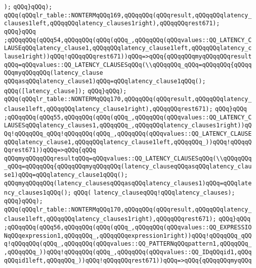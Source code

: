 \verb|);|\newline
\verb|qQQq}qQQq);|\newline
\verb|qQQq(qQQqlr_table::NONTERMqQQq169,qQQqqQQq(qQQqresult,qQQqqQQqlatency_clauses1left,qQQqqQQqlatency_clauses1right),qQQqqQQqrest671);|\newline
\verb|qQQq}qQQq|\newline
\verb|;qQQqqQQq(qQQq54,qQQqqQQq(qQQq(qQQq_,qQQqqQQq(qQQqvalues::QQ_LATENCY_CLAUSEqQQqlatency_clause1,qQQqqQQqlatency_clause1left,qQQqqQQqlatency_clause1right))qQQq!qQQqqQQqrest671))qQQq=>qQQq{qQQqqQQqmyqQQqqQQqresultqQQq=qQQqvalues::QQ_LATENCY_CLAUSESqQQq(\\qQQqqQQq_qQQq=qQQqqQQq{qQQqqQQqmyqQQqqQQq(latency_clause|\newline
\verb|qQQqasqQQqlatency_clause1)qQQq=qQQqlatency_clause1qQQq();|\newline
\verb|qQQq([latency_clause]);|\newline
\verb|qQQq}qQQq);|\newline
\verb|qQQq(qQQqlr_table::NONTERMqQQq170,qQQqqQQq(qQQqresult,qQQqqQQqlatency_clause1left,qQQqqQQqlatency_clause1right),qQQqqQQqrest671);|\newline
\verb|qQQq}qQQq|\newline
\verb|;qQQqqQQq(qQQq55,qQQqqQQq(qQQq(qQQq_,qQQqqQQq(qQQqvalues::QQ_LATENCY_CLAUSESqQQqlatency_clauses1,qQQqqQQq_,qQQqqQQqlatency_clauses1right))qQQq!qQQqqQQq_qQQq!qQQqqQQq(qQQq_,qQQqqQQq(qQQqvalues::QQ_LATENCY_CLAUSEqQQqlatency_clause1,qQQqqQQqlatency_clause1left,qQQqqQQq_))qQQq!qQQqqQQqrest671))qQQq=>qQQq{qQQq|\newline
\verb|qQQqmyqQQqqQQqresultqQQq=qQQqvalues::QQ_LATENCY_CLAUSESqQQq(\\qQQqqQQq_qQQq=qQQqqQQq{qQQqqQQqmyqQQqqQQq(latency_clauseqQQqasqQQqlatency_clause1)qQQq=qQQqlatency_clause1qQQq();|\newline
\verb|qQQqmyqQQqqQQq(latency_clausesqQQqasqQQqlatency_clauses1)qQQq=qQQqlatency_clauses1qQQq();|\newline
\verb|qQQq(|\newline
\verb|latency_clauseqQQq!qQQqlatency_clauses);|\newline
\verb|qQQq}qQQq);|\newline
\verb|qQQq(qQQqlr_table::NONTERMqQQq170,qQQqqQQq(qQQqresult,qQQqqQQqlatency_clause1left,qQQqqQQqlatency_clauses1right),qQQqqQQqrest671);|\newline
\verb|qQQq}qQQq|\newline
\verb|;qQQqqQQq(qQQq56,qQQqqQQq(qQQq(qQQq_,qQQqqQQq(qQQqvalues::QQ_EXPRESSIONqQQqexpression1,qQQqqQQq_,qQQqqQQqexpression1right))qQQq!qQQqqQQq_qQQq!qQQqqQQq(qQQq_,qQQqqQQq(qQQqvalues::QQ_PATTERNqQQqpattern1,qQQqqQQq_,qQQqqQQq_))qQQq!qQQqqQQq(qQQq_,qQQqqQQq(qQQqvalues::QQ_IDqQQqid1,qQQqqQQqid1left,qQQqqQQq_))qQQq!qQQqqQQqrest671))qQQq=>qQQq{qQQqqQQqmyqQQq|\newline
